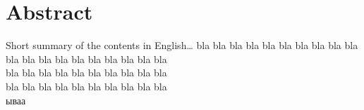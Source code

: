 \begingroup
\let\clearpage\relax
\let\cleardoublepage\relax
\let\cleardoublepage\relax

\chapter*{Abstract}
Short summary of the contents in English\dots
bla bla bla bla bla bla bla bla bla bla \\
bla bla bla bla bla bla bla bla bla bla \\
bla bla bla bla bla bla bla bla bla bla \\
bla bla bla bla bla bla bla bla bla bla \\
\Rus 
ываа


\vfill




\endgroup			

\vfill
